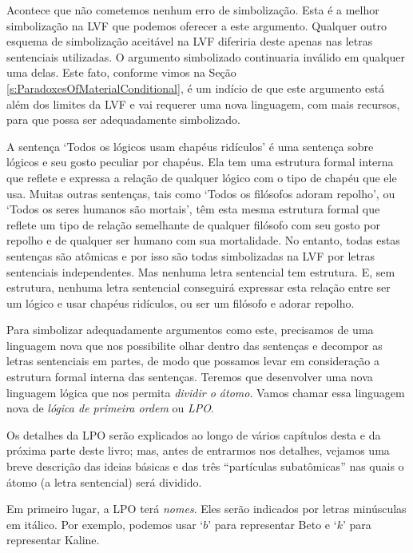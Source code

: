 Acontece que não cometemos nenhum erro de simbolização.
Esta é a melhor simbolização na LVF que podemos oferecer a este argumento.
Qualquer outro esquema de simbolização aceitável na LVF diferiria deste apenas nas letras sentenciais utilizadas.
O argumento simbolizado continuaria inválido em qualquer uma delas.
Este fato, conforme vimos na Seção \ref{s:ParadoxesOfMaterialConditional}, é um indício de que este argumento está além dos limites da LVF e vai requerer uma nova linguagem, com mais recursos, para que possa ser adequadamente simbolizado.

A sentença `Todos os lógicos usam chapéus ridículos' é uma sentença sobre lógicos e seu gosto peculiar por chapéus.
Ela tem uma estrutura formal interna que reflete e expressa a relação de qualquer lógico com o tipo de chapéu que ele usa.
Muitas outras sentenças, tais como `Todos os filósofos adoram repolho', ou  `Todos os seres humanos são mortais', têm esta mesma estrutura formal que reflete um tipo de relação semelhante de qualquer filósofo com seu gosto por repolho e de qualquer ser humano com sua mortalidade. 
No entanto, todas estas sentenças são atômicas e por isso são todas simbolizadas na LVF por letras sentenciais independentes.
Mas nenhuma letra sentencial tem estrutura.
E, sem estrutura, nenhuma letra sentencial conseguirá expressar esta relação entre ser um lógico e usar chapéus ridículos, ou ser um filósofo e adorar repolho.

Para simbolizar adequadamente argumentos como este, precisamos de uma linguagem nova que nos possibilite olhar dentro das sentenças e decompor as letras sentenciais em partes, de modo que possamos levar em consideração a estrutura formal interna das sentenças.
Teremos que desenvolver uma nova linguagem lógica que nos permita \emph{dividir o átomo}.
Vamos chamar essa linguagem nova de \emph{lógica de primeira ordem} ou \emph{LPO}.

Os detalhes da LPO serão explicados ao longo de vários capítulos desta e da próxima parte deste livro; mas, antes de entrarmos nos detalhes, vejamos uma breve descrição das ideias básicas e das três ``partículas subatômicas'' nas quais  o átomo (a letra sentencial) será dividido.

Em primeiro lugar, a LPO terá \emph{nomes}.
Eles serão indicados por letras minúsculas em itálico.
Por exemplo, podemos usar `$b$' para representar Beto e `$k$' para representar Kaline.

